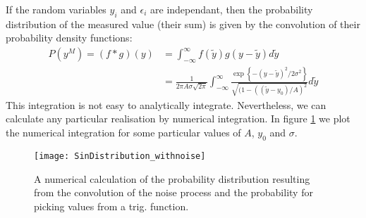 \documentclass[/home/greg/Thesis/main/main.tex]{subfiles}
\begin{document}
If the random variables $y_{i}$ and $\epsilon_i$ are independant, then the
probability distribution of the measured value (their sum) is
given by the convolution of their probability density functions:
\begin{align}
    P(y^{M}) = (f * g)(y) & = \int_{-\infty}^{\infty} f(\tilde{y}) g(y - \tilde{y}) d\tilde{y} \\
                          & = \frac{1}{2\pi A\sigma\sqrt{2\pi}} \int_{-\infty}^{\infty}
\frac{\exp\left\{-(y - \tilde{y})^{2}/2\sigma^{2}\right\}}
{\sqrt{(1 - \left((\tilde{y} - y_{0}) / A \right)^{2}}}
d\tilde{y}
\end{align}
This integration is not easy to analytically integrate. Nevertheless, we can 
calculate any particular realisation by numerical integration. In figure
\ref{fig: SinDistribution with noise} we plot the numerical integration for 
some particular values of $A$, $y_{0}$ and $\sigma$.
\begin{figure}[htb]
    \centering
    \texttt{[image: SinDistribution\_withnoise]}
    \caption{A numerical calculation of the probability distribution resulting
             from the convolution of the noise process and the probability for
             picking values from a trig. function.}
    \label{fig: SinDistribution with noise}
\end{figure}


\biblio
\end{document}
